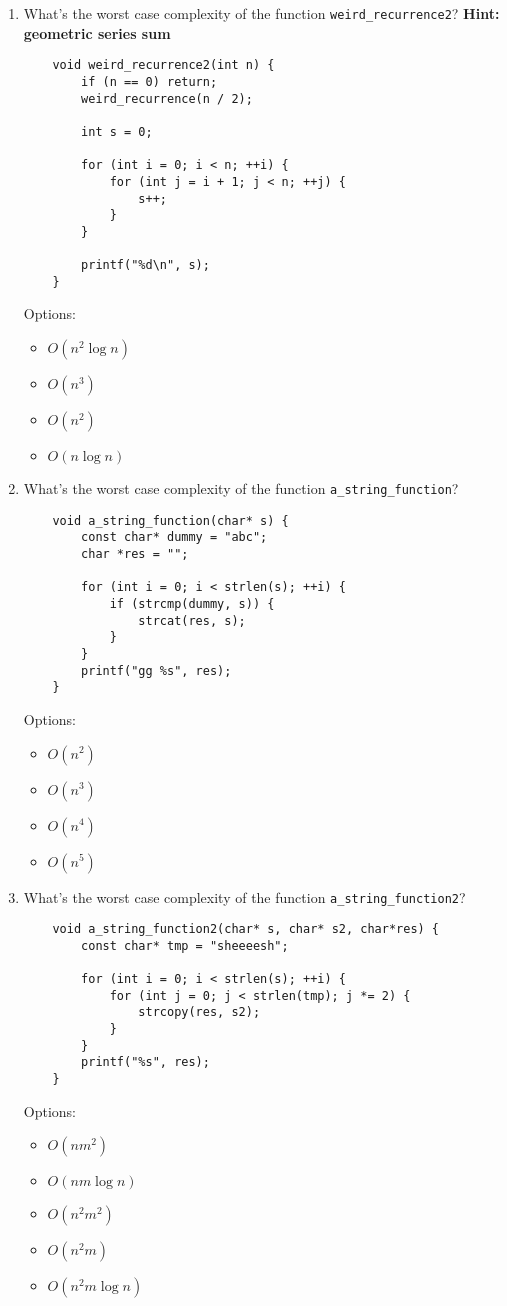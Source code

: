 \documentclass{article}
\begin{document}
\begin{enumerate}
    \item What’s the worst case complexity of the function \texttt{weird\_recurrence2}?
    \textbf{Hint: geometric series sum}
    \begin{lstlisting}
    void weird_recurrence2(int n) {
        if (n == 0) return;
        weird_recurrence(n / 2);

        int s = 0;

        for (int i = 0; i < n; ++i) {
            for (int j = i + 1; j < n; ++j) {
                s++;
            }
        }

        printf("%d\n", s);
    }
    \end{lstlisting}
    Options:
    \begin{itemize}
        \item \( O(n^2 \log n) \)
        \item \( O(n^3) \)
        \item \( O(n^2) \)
        \item \( O(n \log n) \)
    \end{itemize}

    
    \item What’s the worst case complexity of the function \texttt{a\_string\_function}?
    
    \begin{lstlisting}
    void a_string_function(char* s) {
        const char* dummy = "abc";
        char *res = "";

        for (int i = 0; i < strlen(s); ++i) {
            if (strcmp(dummy, s)) {
                strcat(res, s);
            }
        }
        printf("gg %s", res);
    }
    \end{lstlisting}
    Options:
    \begin{itemize}
        \item \( O(n^2) \)
        \item \( O(n^3) \)
        \item \( O(n^4) \)
        \item \( O(n^5) \)
    \end{itemize}

    \newpage

    \item What’s the worst case complexity of the function \texttt{a\_string\_function2}?
    \begin{lstlisting}
    void a_string_function2(char* s, char* s2, char*res) {
        const char* tmp = "sheeeesh";

        for (int i = 0; i < strlen(s); ++i) {
            for (int j = 0; j < strlen(tmp); j *= 2) {
                strcopy(res, s2);
            }
        }
        printf("%s", res);
    }
    \end{lstlisting}
    Options:
    \begin{itemize}
        \item \( O(nm^2) \)
        \item \( O(nm \log n) \)
        \item \( O(n^2m^2) \)
        \item \( O(n^2m) \)
        \item \( O(n^2m \log n) \)
    \end{itemize}


\end{enumerate}
\end{document}
